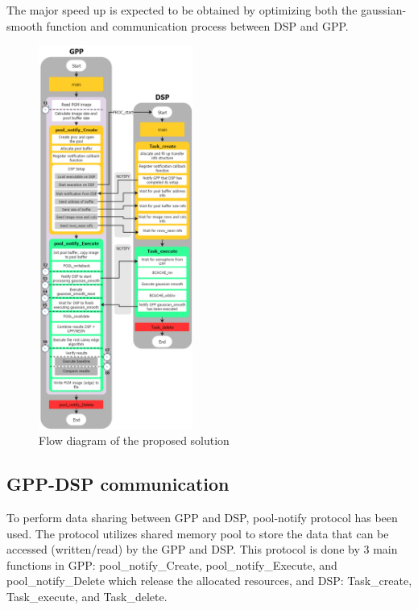 \documentclass[conference]{IEEEtran}
\begin{document}
The major speed up is expected to be obtained by optimizing both the gaussian-smooth function and communication process between DSP and GPP.     

\begin{figure}[!ht]
    \centering
    \includegraphics[width=0.45\textwidth]{pic/timing_diagram.png}
   \caption{Flow diagram of the proposed solution}
   \label{fig:timingdiagram}
\end{figure} 



\subsection{GPP-DSP communication}
To perform data sharing between GPP and DSP, pool-notify protocol \cite{paper2} has been used. The protocol utilizes shared memory pool to store the data that can be accessed (written/read) by the GPP and DSP. This protocol is done by 3 main functions in GPP: pool\_notify\_Create, pool\_notify\_Execute, and pool\_notify\_Delete which release the allocated resources, and DSP: Task\_create, Task\_execute, and Task\_delete.
\end{document}
